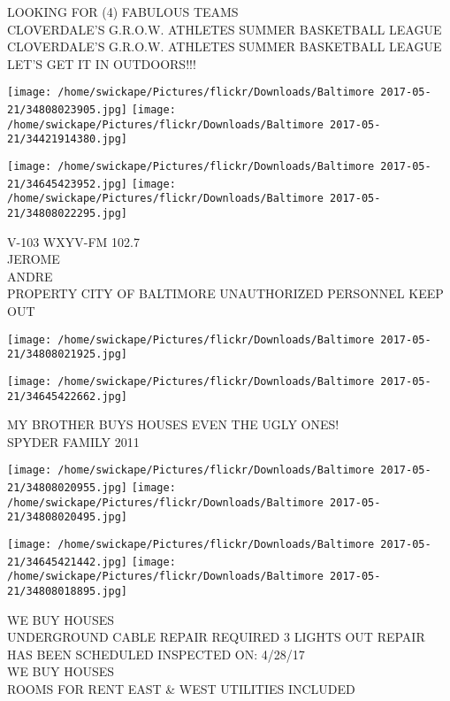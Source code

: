 \documentclass[10pt,letterpaper]{article}
\begin{document}
LOOKING FOR (4) FABULOUS TEAMS\\
CLOVERDALE'S G.R.O.W. ATHLETES SUMMER BASKETBALL LEAGUE\\
CLOVERDALE'S G.R.O.W. ATHLETES SUMMER BASKETBALL LEAGUE LET'S GET IT IN OUTDOORS!!!\\
\pagebreak

\texttt{[image: /home/swickape/Pictures/flickr/Downloads/Baltimore 2017-05-21/34808023905.jpg]}
\texttt{[image: /home/swickape/Pictures/flickr/Downloads/Baltimore 2017-05-21/34421914380.jpg]}

\texttt{[image: /home/swickape/Pictures/flickr/Downloads/Baltimore 2017-05-21/34645423952.jpg]}
\texttt{[image: /home/swickape/Pictures/flickr/Downloads/Baltimore 2017-05-21/34808022295.jpg]}

V{-}103 WXYV{-}FM 102.7\\
JEROME\\
ANDRE\\
PROPERTY CITY OF BALTIMORE UNAUTHORIZED PERSONNEL KEEP OUT\\
\pagebreak

\texttt{[image: /home/swickape/Pictures/flickr/Downloads/Baltimore 2017-05-21/34808021925.jpg]}

\vspace{0.25in}
\texttt{[image: /home/swickape/Pictures/flickr/Downloads/Baltimore 2017-05-21/34645422662.jpg]}

MY BROTHER BUYS HOUSES EVEN THE UGLY ONES!\\
SPYDER FAMILY 2011\\
\pagebreak

\texttt{[image: /home/swickape/Pictures/flickr/Downloads/Baltimore 2017-05-21/34808020955.jpg]}
\texttt{[image: /home/swickape/Pictures/flickr/Downloads/Baltimore 2017-05-21/34808020495.jpg]}

\texttt{[image: /home/swickape/Pictures/flickr/Downloads/Baltimore 2017-05-21/34645421442.jpg]}
\texttt{[image: /home/swickape/Pictures/flickr/Downloads/Baltimore 2017-05-21/34808018895.jpg]}

WE BUY HOUSES\\
UNDERGROUND CABLE REPAIR REQUIRED 3 LIGHTS OUT REPAIR HAS BEEN SCHEDULED INSPECTED ON: 4/28/17\\
WE BUY HOUSES\\
ROOMS FOR RENT EAST \& WEST UTILITIES INCLUDED\\
\pagebreak
\end{document}
